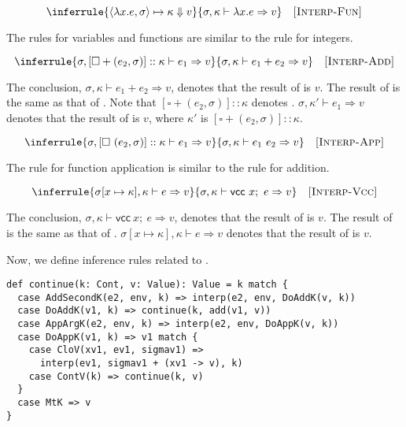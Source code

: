 \[
  \inferrule
  { \langle\lambda x.e,\sigma\rangle\mapsto\kappa\Downarrow v }
  { \sigma,\kappa\vdash \lambda x.e\Rightarrow v }
  \quad\textsc{[Interp-Fun]}
\]

The rules for variables and functions are similar to the rule for integers.

\[
  \inferrule
  { \sigma,[\square+(e_2,\sigma)]::\kappa\vdash e_1\Rightarrow v }
  { \sigma,\kappa\vdash e_1+e_2\Rightarrow v }
  \quad\textsc{[Interp-Add]}
\]

The conclusion, $\sigma,\kappa\vdash e_1+e_2\Rightarrow v$, denotes that the
result of  is $v$. The result
of  is the same as that of
. Note that
$[\square+(e_2,\sigma)]::\kappa$ denotes .
$\sigma,\kappa'\vdash e_1\Rightarrow v$ denotes that the result of
 is $v$, where $\kappa'$ is
$[\square+(e_2,\sigma)]::\kappa$.

\[
  \inferrule
  { \sigma,[\square\ (e_2,\sigma)]::\kappa\vdash e_1\Rightarrow v }
  { \sigma,\kappa\vdash e_1\ e_2\Rightarrow v }
  \quad\textsc{[Interp-App]}
\]

The rule for function application is similar to the rule for addition.

\[
  \inferrule
  { \sigma[x\mapsto\kappa],\kappa\vdash e\Rightarrow v }
  { \sigma,\kappa\vdash \textsf{vcc}\ x;\ e\Rightarrow v }
  \quad\textsc{[Interp-Vcc]}
\]

The conclusion, $\sigma,\kappa\vdash \textsf{vcc}\ x;\ e\Rightarrow v$, denotes that
the result of  is $v$. The result
of  is the same as that of
. $\sigma[x\mapsto\kappa],\kappa\vdash
e\Rightarrow v$ denotes that the result of  is $v$.

Now, we define inference rules related to .

\begin{verbatim}
def continue(k: Cont, v: Value): Value = k match {
  case AddSecondK(e2, env, k) => interp(e2, env, DoAddK(v, k))
  case DoAddK(v1, k) => continue(k, add(v1, v))
  case AppArgK(e2, env, k) => interp(e2, env, DoAppK(v, k))
  case DoAppK(v1, k) => v1 match {
    case CloV(xv1, ev1, sigmav1) =>
      interp(ev1, sigmav1 + (xv1 -> v), k)
    case ContV(k) => continue(k, v)
  }
  case MtK => v
}
\end{verbatim}

